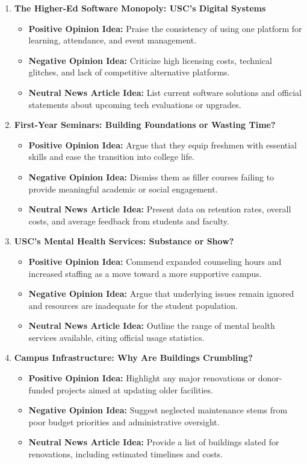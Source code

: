 \documentclass{article}
\begin{document}
\begin{enumerate}
    \item \textbf{The Higher-Ed Software Monopoly: USC’s Digital Systems}
    \begin{itemize}
        \item \textbf{Positive Opinion Idea:} Praise the consistency of using one platform for learning, attendance, and event management.
        \item \textbf{Negative Opinion Idea:} Criticize high licensing costs, technical glitches, and lack of competitive alternative platforms.
        \item \textbf{Neutral News Article Idea:} List current software solutions and official statements about upcoming tech evaluations or upgrades.
    \end{itemize}

    \item \textbf{First-Year Seminars: Building Foundations or Wasting Time?}
    \begin{itemize}
        \item \textbf{Positive Opinion Idea:} Argue that they equip freshmen with essential skills and ease the transition into college life.
        \item \textbf{Negative Opinion Idea:} Dismiss them as filler courses failing to provide meaningful academic or social engagement.
        \item \textbf{Neutral News Article Idea:} Present data on retention rates, overall costs, and average feedback from students and faculty.
    \end{itemize}

    \item \textbf{USC’s Mental Health Services: Substance or Show?}
    \begin{itemize}
        \item \textbf{Positive Opinion Idea:} Commend expanded counseling hours and increased staffing as a move toward a more supportive campus.
        \item \textbf{Negative Opinion Idea:} Argue that underlying issues remain ignored and resources are inadequate for the student population.
        \item \textbf{Neutral News Article Idea:} Outline the range of mental health services available, citing official usage statistics.
    \end{itemize}

    \item \textbf{Campus Infrastructure: Why Are Buildings Crumbling?}
    \begin{itemize}
        \item \textbf{Positive Opinion Idea:} Highlight any major renovations or donor-funded projects aimed at updating older facilities.
        \item \textbf{Negative Opinion Idea:} Suggest neglected maintenance stems from poor budget priorities and administrative oversight.
        \item \textbf{Neutral News Article Idea:} Provide a list of buildings slated for renovations, including estimated timelines and costs.
    \end{itemize}


\end{enumerate}
\end{document}
